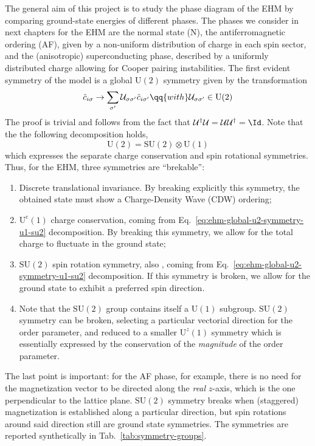 The general aim of this project is to study the phase diagram of the EHM by comparing ground-state energies of different phases. The phases we consider in next chapters for the EHM are the normal state (N), the antiferromagnetic ordering (AF), given by a non-uniform distribution of charge in each spin sector, and the (anisotropic) superconducting phase, described by a uniformly distributed charge allowing for Cooper pairing instabilities. The first evident symmetry of the model is a global $\mathrm{U}(2)$ symmetry \cite{arovas2022hubbard} given by the transformation
\begin{equation}\label{eq:ehm-global-u2-symmetry}
	\hat c_{i\sigma} \to \sum_{\sigma'} \mathcal{U}_{\sigma \sigma'} \hat c_{i\sigma'}
	\qq{with}
	\mathcal{U}_{\sigma \sigma'} \in \mathrm{U}(2)
\end{equation}
The proof is trivial and follows from the fact that $\mathcal{U}^\dagger \mathcal{U} = \mathcal{U} \mathcal{U}^\dagger = \Id$. Note that the the following decomposition holds,
\begin{equation}\label{eq:ehm-global-u2-symmetry-u1-su2}
	\mathrm{U}(2) = \mathrm{SU}(2) \otimes \mathrm{U}(1)
\end{equation}
which expresses the separate charge conservation and spin rotational symmetries. Thus, for the EHM, three symmetries are ``brekable'':
\begin{enumerate}
	\item Discrete translational invariance. By breaking explicitly this symmetry, the obtained state must show a Charge-Density Wave (CDW) ordering;
	\item $\mathrm{U}^\mathrm{c}(1)$ charge conservation, coming from Eq.~\eqref{eq:ehm-global-u2-symmetry-u1-su2} decomposition. By breaking this symmetry, we allow for the total charge to fluctuate in the ground state;
	\item $\mathrm{SU}(2)$ spin rotation symmetry, also , coming from Eq.~\eqref{eq:ehm-global-u2-symmetry-u1-su2} decomposition. If this symmetry is broken, we allow for the ground state to exhibit a preferred spin direction.
	\item Note that the $\mathrm{SU}(2)$ group contains itself a $\mathrm{U}(1)$ subgroup. $\mathrm{SU}(2)$ symmetry can be broken, selecting a particular vectorial direction for the order parameter, and reduced to a smaller $\mathrm{U}^z(1)$ symmetry which is essentially expressed by the conservation of the \textit{magnitude} of the order parameter.
\end{enumerate}
The last point is important: for the AF phase, for example, there is no need for the magnetization vector to be directed along the \textit{real} $z$-axis, which is the one perpendicular to the lattice plane. $\mathrm{SU}(2)$ symmetry breaks when (staggered) magnetization is established along a particular direction, but spin rotations around said direction still are ground state symmetries. The symmetries are reported synthetically in Tab.~\ref{tab:symmetry-groups}.


